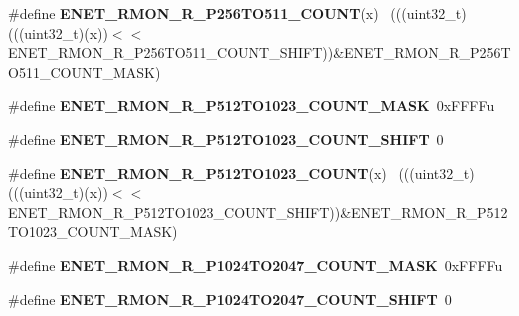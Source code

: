 \begin{DoxyCompactItemize}
\item 
\hypertarget{group___e_n_e_t___register___masks_ga9ea4baccff9b72ad23e824734f460e4e}{}\#define {\bfseries E\+N\+E\+T\+\_\+\+R\+M\+O\+N\+\_\+\+R\+\_\+\+P256\+T\+O511\+\_\+\+C\+O\+U\+N\+T}(x)                  ~(((uint32\+\_\+t)(((uint32\+\_\+t)(x))$<$$<$E\+N\+E\+T\+\_\+\+R\+M\+O\+N\+\_\+\+R\+\_\+\+P256\+T\+O511\+\_\+\+C\+O\+U\+N\+T\+\_\+\+S\+H\+I\+F\+T))\&E\+N\+E\+T\+\_\+\+R\+M\+O\+N\+\_\+\+R\+\_\+\+P256\+T\+O511\+\_\+\+C\+O\+U\+N\+T\+\_\+\+M\+A\+S\+K)\label{group___e_n_e_t___register___masks_ga9ea4baccff9b72ad23e824734f460e4e}

\item 
\hypertarget{group___e_n_e_t___register___masks_ga0b38c45c87433335a5cc1e65eaca9f67}{}\#define {\bfseries E\+N\+E\+T\+\_\+\+R\+M\+O\+N\+\_\+\+R\+\_\+\+P512\+T\+O1023\+\_\+\+C\+O\+U\+N\+T\+\_\+\+M\+A\+S\+K}~0x\+F\+F\+F\+Fu\label{group___e_n_e_t___register___masks_ga0b38c45c87433335a5cc1e65eaca9f67}

\item 
\hypertarget{group___e_n_e_t___register___masks_ga2cc28edd9bf71e3f65d514fd9e1ba3ba}{}\#define {\bfseries E\+N\+E\+T\+\_\+\+R\+M\+O\+N\+\_\+\+R\+\_\+\+P512\+T\+O1023\+\_\+\+C\+O\+U\+N\+T\+\_\+\+S\+H\+I\+F\+T}~0\label{group___e_n_e_t___register___masks_ga2cc28edd9bf71e3f65d514fd9e1ba3ba}

\item 
\hypertarget{group___e_n_e_t___register___masks_gaae1e4eba307918f812f5551113b5bc2d}{}\#define {\bfseries E\+N\+E\+T\+\_\+\+R\+M\+O\+N\+\_\+\+R\+\_\+\+P512\+T\+O1023\+\_\+\+C\+O\+U\+N\+T}(x)                ~(((uint32\+\_\+t)(((uint32\+\_\+t)(x))$<$$<$E\+N\+E\+T\+\_\+\+R\+M\+O\+N\+\_\+\+R\+\_\+\+P512\+T\+O1023\+\_\+\+C\+O\+U\+N\+T\+\_\+\+S\+H\+I\+F\+T))\&E\+N\+E\+T\+\_\+\+R\+M\+O\+N\+\_\+\+R\+\_\+\+P512\+T\+O1023\+\_\+\+C\+O\+U\+N\+T\+\_\+\+M\+A\+S\+K)\label{group___e_n_e_t___register___masks_gaae1e4eba307918f812f5551113b5bc2d}

\item 
\hypertarget{group___e_n_e_t___register___masks_ga9e6dbfdcd74c5b14ff7987973c952753}{}\#define {\bfseries E\+N\+E\+T\+\_\+\+R\+M\+O\+N\+\_\+\+R\+\_\+\+P1024\+T\+O2047\+\_\+\+C\+O\+U\+N\+T\+\_\+\+M\+A\+S\+K}~0x\+F\+F\+F\+Fu\label{group___e_n_e_t___register___masks_ga9e6dbfdcd74c5b14ff7987973c952753}

\item 
\hypertarget{group___e_n_e_t___register___masks_gacf33c89b25640b4d44a0cc1a7e8ee178}{}\#define {\bfseries E\+N\+E\+T\+\_\+\+R\+M\+O\+N\+\_\+\+R\+\_\+\+P1024\+T\+O2047\+\_\+\+C\+O\+U\+N\+T\+\_\+\+S\+H\+I\+F\+T}~0\label{group___e_n_e_t___register___masks_gacf33c89b25640b4d44a0cc1a7e8ee178}


\end{DoxyCompactItemize}
